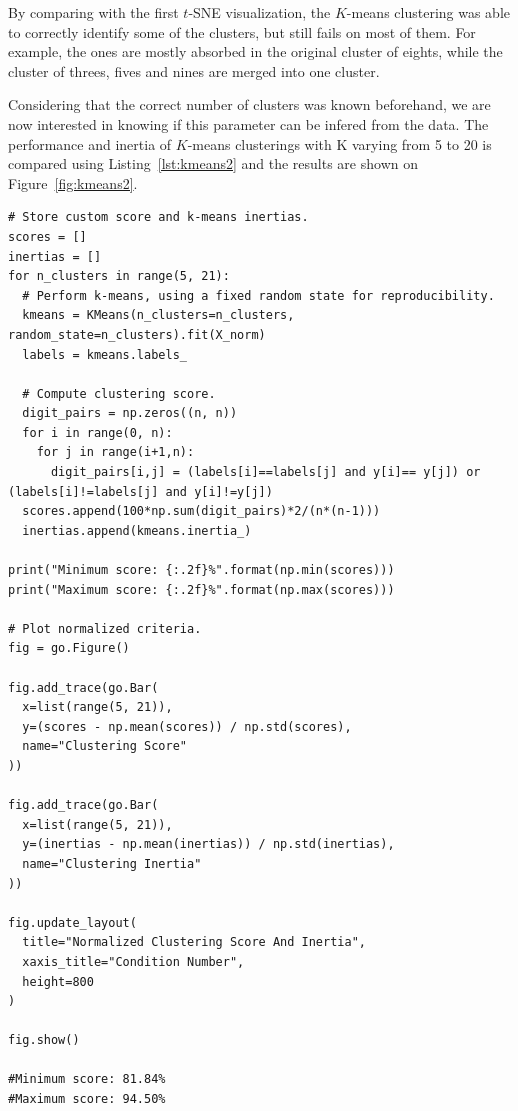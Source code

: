 \documentclass[12pt]{article}
\begin{document}
  By comparing with the first $t$-SNE visualization, the $K$-means clustering
  was able to correctly identify some of the clusters, but still fails on most
  of them. For example, the ones are mostly absorbed in the original cluster of
  eights, while the cluster of threes, fives and nines are merged into one
  cluster.

  Considering that the correct number of clusters was known beforehand, we are
  now interested in knowing if this parameter can be infered from the data. The
  performance and inertia of $K$-means clusterings with K varying from 5 to 20
  is compared using Listing~\ref{lst:kmeans2} and the results are shown on
  Figure~\ref{fig:kmeans2}.

  \begin{lstlisting}[caption={Perform $K$-means clustering and compare
    performance using varying number of clusters.}, captionpos=b,
    label={lst:kmeans2}]
# Store custom score and k-means inertias.
scores = []
inertias = []
for n_clusters in range(5, 21):
  # Perform k-means, using a fixed random state for reproducibility.
  kmeans = KMeans(n_clusters=n_clusters, random_state=n_clusters).fit(X_norm)
  labels = kmeans.labels_
    
  # Compute clustering score.
  digit_pairs = np.zeros((n, n))
  for i in range(0, n):
    for j in range(i+1,n):
      digit_pairs[i,j] = (labels[i]==labels[j] and y[i]== y[j]) or (labels[i]!=labels[j] and y[i]!=y[j])
  scores.append(100*np.sum(digit_pairs)*2/(n*(n-1))) 
  inertias.append(kmeans.inertia_)

print("Minimum score: {:.2f}%".format(np.min(scores)))
print("Maximum score: {:.2f}%".format(np.max(scores)))

# Plot normalized criteria.
fig = go.Figure()

fig.add_trace(go.Bar(
  x=list(range(5, 21)),
  y=(scores - np.mean(scores)) / np.std(scores),
  name="Clustering Score"
))

fig.add_trace(go.Bar(
  x=list(range(5, 21)),
  y=(inertias - np.mean(inertias)) / np.std(inertias),
  name="Clustering Inertia"
))

fig.update_layout(
  title="Normalized Clustering Score And Inertia",
  xaxis_title="Condition Number",
  height=800
)

fig.show()

#Minimum score: 81.84%
#Maximum score: 94.50%
  \end{lstlisting}
\end{document}
